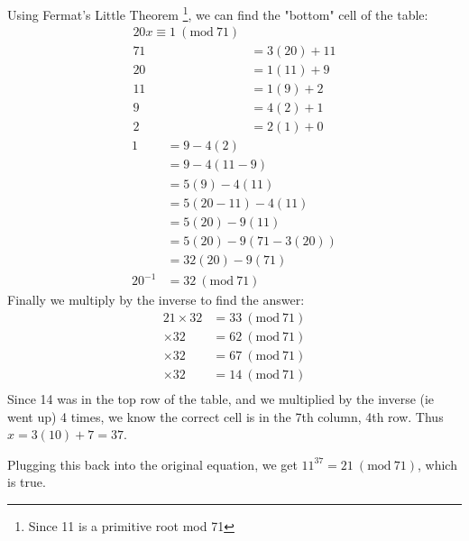 \documentclass{article}
\newcommand{\Mod}[1]{\ (\mathrm{mod}\ #1)}
\begin{document}
\begin{enumerate}[label=(\alph*)]
          Using Fermat's Little Theorem \footnote{Since 11 is a primitive root mod 71}, we can find the "bottom" cell of the table:
          \begin{align*}
              20x \equiv 1 \Mod{71} &              \\
              71                    & = 3(20) + 11 \\
              20                    & = 1(11) + 9  \\
              11                    & = 1(9) + 2   \\
              9                     & = 4(2) + 1   \\
              2                     & = 2(1) + 0
          \end{align*}
          \begin{align*}
              1       & = 9 - 4(2)              \\
                      & = 9 - 4(11 - 9)         \\
                      & = 5(9) - 4(11)          \\
                      & = 5(20 - 11) - 4(11)    \\
                      & = 5(20) - 9(11)         \\
                      & = 5(20) - 9(71 - 3(20)) \\
                      & = 32(20) - 9(71)        \\
              20^{-1} & = 32 \Mod{71}
          \end{align*}
          Finally we multiply by the inverse to find the answer:
          \begin{align*}
              21 \times 32 & = 33 \Mod{71} \\
              \times 32    & = 62 \Mod{71} \\
              \times 32    & = 67 \Mod{71} \\
              \times 32    & = 14 \Mod{71} \\
          \end{align*}
          Since 14 was in the top row of the table, and we multiplied by the inverse (ie went up)
          4 times, we know the correct cell is in the 7th column, 4th row. Thus
          \(x = 3(10) + 7 = 37\).

          Plugging this back into the original equation, we get
          \(11^{37} = 21 \Mod{71}\), which is true.
\end{enumerate}

\pagebreak
\end{document}
